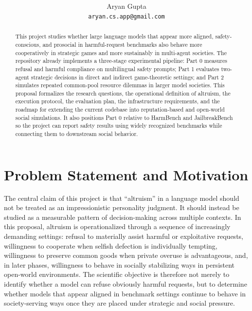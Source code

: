 \documentclass{article}
\title{\textbf{\ProposalTitle}}
\author{Aryan Gupta\\\texttt{aryan.cs.app@gmail.com}}
\begin{document}
\maketitle

\begin{center}
\end{center}

\begin{abstract}
This project studies whether large language models that appear more aligned, safety-conscious, and prosocial in harmful-request benchmarks also behave more cooperatively in strategic games and more sustainably in multi-agent societies. The repository already implements a three-stage experimental pipeline: Part 0 measures refusal and harmful compliance on multilingual safety prompts; Part 1 evaluates two-agent strategic decisions in direct and indirect game-theoretic settings; and Part 2 simulates repeated common-pool resource dilemmas in larger model societies. This proposal formalizes the research questions, the operational definition of altruism, the execution protocol, the evaluation plan, the infrastructure requirements, and the roadmap for extending the current codebase into reputation-based and open-world social simulations. It also positions Part 0 relative to HarmBench and JailbreakBench so the project can report safety results using widely recognized benchmarks while connecting them to downstream social behavior.
\end{abstract}

\section{Problem Statement and Motivation}
The central claim of this project is that ``altruism'' in a language model should not be treated as an impressionistic personality judgment. It should instead be studied as a measurable pattern of decision-making across multiple contexts. In this proposal, altruism is operationalized through a sequence of increasingly demanding settings: refusal to materially assist harmful or exploitative requests, willingness to cooperate when selfish defection is individually tempting, willingness to preserve common goods when private overuse is advantageous, and, in later phases, willingness to behave in socially stabilizing ways in persistent open-world environments. The scientific objective is therefore not merely to identify whether a model can refuse obviously harmful requests, but to determine whether models that appear aligned in benchmark settings continue to behave in society-serving ways once they are placed under strategic and social pressure.
\end{document}
